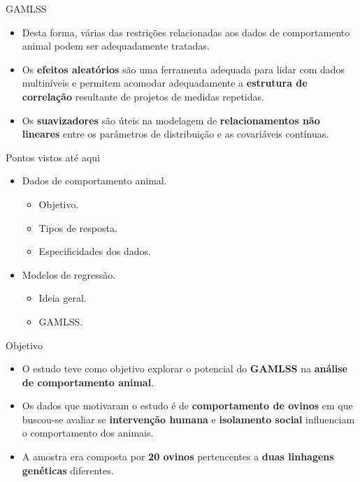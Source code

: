 \documentclass[
  ignorenonframetext,
  serif,
  professionalfont,
  usenames,
  dvipsnames,
  aspectratio = 169]{beamer}
\providecommand{\tightlist}{%
  \setlength{\itemsep}{0pt}\setlength{\parskip}{0pt}}
\renewcommand{\tightlist}{%
  \setlength{\itemsep}{0\baselineskip}
  \setlength{\parskip}{0.25\baselineskip}
}
\def\beginAHalfColumn{\begin{minipage}{0.49\textwidth}}%
\def\endColumns{\end{minipage}}%
\begin{document}
\begin{frame}{GAMLSS}
\protect\hypertarget{gamlss-1}{}
\begin{itemize}
\item
  Desta forma, várias das restrições relacionadas aos dados de
  comportamento animal podem ser adequadamente tratadas.
\item
  Os \textbf{efeitos aleatórios} são uma ferramenta adequada para lidar
  com dados multiníveis e permitem acomodar adequadamente a
  \textbf{estrutura de correlação} resultante de projetos de medidas
  repetidas.
\item
  Os \textbf{suavizadores} são úteis na modelagem de
  \textbf{relacionamentos não lineares} entre os parâmetros de
  distribuição e as covariáveis contínuas.
\end{itemize}
\end{frame}

\begin{frame}{Pontos vistos até aqui}
\protect\hypertarget{pontos-vistos-atuxe9-aqui}{}
\beginAHalfColumn

\begin{itemize}
\tightlist
\item
  Dados de comportamento animal.

  \begin{itemize}
  \tightlist
  \item
    Objetivo.
  \item
    Tipos de resposta.
  \item
    Especificidades dos dados.
  \end{itemize}
\item
  Modelos de regressão.

  \begin{itemize}
  \tightlist
  \item
    Ideia geral.
  \item
    GAMLSS.
  \end{itemize}
\end{itemize}

\endColumns
\beginAHalfColumn

\endColumns
\end{frame}

\begin{frame}{Objetivo}
\protect\hypertarget{objetivo}{}
\begin{itemize}
\item
  O estudo teve como objetivo explorar o potencial do \textbf{GAMLSS} na
  \textbf{análise de comportamento animal}.
\item
  Os dados que motivaram o estudo é de \textbf{comportamento de ovinos}
  em que buscou-se avaliar se \textbf{intervenção humana} e
  \textbf{isolamento social} influenciam o comportamento dos animais.
\item
  A amostra era composta por \textbf{20 ovinos} pertencentes a
  \textbf{duas linhagens genéticas} diferentes.
\end{itemize}
\end{frame}
\end{document}
